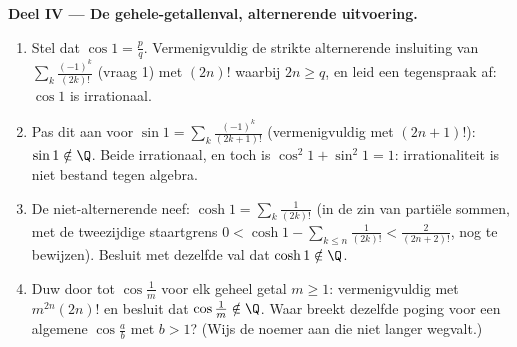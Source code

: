 \begin{problem}
\medskip
\noindent\textbf{Deel IV --- De gehele-getallenval, alternerende
uitvoering.}
\begin{enumerate}[resume]
  \item Stel dat $\cos 1 = \frac pq$. Vermenigvuldig de strikte
        alternerende insluiting van $\sum_{k}
        \frac{(-1)^k}{(2k)!}$ (vraag 1) met $(2n)!$ waarbij $2n
        \geq q$, en leid een tegenspraak af: $\cos 1$ is
        irrationaal.
  \item Pas dit aan voor $\sin 1 = \sum_k
        \frac{(-1)^k}{(2k+1)!}$ (vermenigvuldig met $(2n+1)!$):
        $\sin 1 \notin \Q$. Beide irrationaal, en toch is
        $\cos^2 1 + \sin^2 1 = 1$: irrationaliteit is niet
        bestand tegen algebra.
  \item De niet-alternerende neef: $\cosh 1 = \sum_k
        \frac{1}{(2k)!}$ (in de zin van partiële sommen, met de
        tweezijdige staartgrens $0 < \cosh 1 - \sum_{k \leq n}
        \frac{1}{(2k)!} < \frac{2}{(2n+2)!}$, nog te bewijzen).
        Besluit met dezelfde val dat $\cosh 1 \notin \Q$.
  \item Duw door tot $\cos\frac 1m$ voor elk geheel getal $m \geq
        1$: vermenigvuldig met $m^{2n}(2n)!$ en besluit dat
        $\cos\frac1m \notin \Q$. Waar breekt dezelfde poging voor
        een algemene $\cos\frac ab$ met $b > 1$? (Wijs de noemer
        aan die niet langer wegvalt.)
\end{enumerate}


\end{problem}
